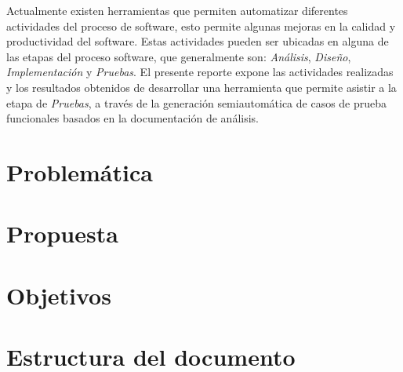 Actualmente existen herramientas que permiten automatizar diferentes actividades del proceso de software, esto permite algunas mejoras en la calidad y productividad del software. Estas actividades pueden ser ubicadas en alguna de las etapas del proceso software, que generalmente son: {\it Análisis}, {\it Diseño}, {\it Implementación} y {\it Pruebas}. El presente reporte expone las actividades realizadas y los resultados obtenidos de desarrollar una herramienta que permite asistir a la etapa de {\it Pruebas}, a través de la generación semiautomática de casos de prueba funcionales basados en la documentación de análisis.


\section{Problemática}

\section{Propuesta}

\section{Objetivos}

\section{Estructura del documento}

